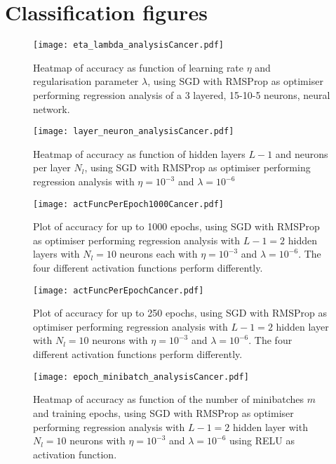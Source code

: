 \clearpage

\section{Classification figures}\label{app:classification}

\begin{figure}[h!]
    \texttt{[image: eta\_lambda\_analysisCancer.pdf]}
    \caption{Heatmap of accuracy as function of learning rate $\eta$ and regularisation parameter $\lambda$, using SGD with RMSProp as optimiser performing regression analysis of a 3 layered, 15-10-5 neurons, neural network. }
    \label{fig:class_eta_lambda}
\end{figure}

\begin{figure}[h!]
    \texttt{[image: layer\_neuron\_analysisCancer.pdf]}
    \caption{Heatmap of accuracy as function of hidden layers $L-1$ and neurons per layer $N_l$, using SGD with RMSProp as optimiser performing regression analysis with $\eta=10^{-3}$ and $\lambda=10^{-6}$ }
    \label{fig:class_layer_neuron}
\end{figure}

\begin{figure}[h!]
    \texttt{[image: actFuncPerEpoch1000Cancer.pdf]}
    \caption{Plot of accuracy for up to 1000 epochs, using SGD with RMSProp as optimiser performing regression analysis with $L-1=2$ hidden layers with $N_l=10$ neurons each with $\eta=10^{-3}$ and $\lambda=10^{-6}$. The four different activation functions perform differently.}
    \label{fig:class_act_epoch1000}
\end{figure}

\begin{figure}[h!]
    \texttt{[image: actFuncPerEpochCancer.pdf]}
    \caption{Plot of accuracy for up to 250 epochs, using SGD with RMSProp as optimiser performing regression analysis with $L-1=2$ hidden layer with $N_l=10$ neurons with $\eta=10^{-3}$ and $\lambda=10^{-6}$. The four different activation functions perform differently.}
    \label{fig:class_act_epoch}
\end{figure}

\begin{figure}[h!]
    \texttt{[image: epoch\_minibatch\_analysisCancer.pdf]}
    \caption{Heatmap of accuracy as function of the number of minibatches $m$ and training epochs, using SGD with RMSProp as optimiser performing regression analysis with $L-1=2$ hidden layer with $N_l=10$ neurons with $\eta=10^{-3}$ and $\lambda=10^{-6}$ using RELU as activation function. }
    \label{fig:class_minibatch_epoch}
\end{figure}


